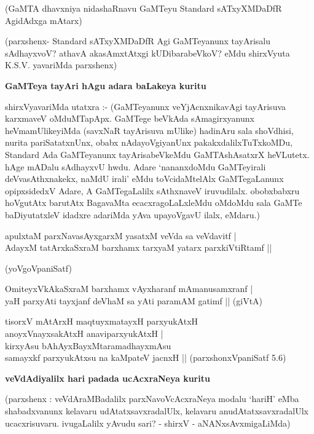 \noindent
(GaMTA dhavxniya nidashaRnavu GaMTeyu {\rm Standard} sATxyXMDaDfR AgidAdxga mAtarx)

(parxshenx- {\rm Standard} sATxyXMDaDfR Agi GaMTeyanunx tayArisalu sAdhayxvoV? athavA akasAmxtAtxgi kUDibarabeVkoV? eMdu shirxVyuta {\rm K.S.V.} yavariMda parxshenx)

{\bigskip
\noindent
{\large\bf GaMTeya tayAri hAgu adara baLakeya kuritu}}\label{page148}
\medskip

\noindent
shirxVyavariMda utatxra :- (GaMTeyanunx veYjAcnxnikavAgi tayArisuva karxmaveV oMduMTapApx. GaMTege beVkAda sAmagirxyanunx heVmamUlikeyiMda (savxNaR tayArisuva mUlike) hadinAru sala shoVdhisi, nurita pariSatatxnUnx, obabx nAdayoVgiyanUnx pakakxdalilxTuTxkoMDu, {\rm Standard} Ada GaMTeyanunx tayArisabeVkeMdu GaMTAshAsatxrX heVLutetx. hAge mADalu sAdhayxvU hwdu. Adare `nananxdoMdu GaMTeyirali deVvasAthxnakekx, naMdU irali' eMdu toVcidaMtelAlx GaMTegaLanunx opipxsidedxV Adare, A GaMTegaLalilx sAthxnaveV iruvudilalx. obobxbabxru hoVgutAtx barutAtx BagavaMta ecacxragoLaLxleMdu oMdoMdu sala GaMTe baDiyutatxleV idadxre adariMda yAva upayoVgavU ilalx, eMdaru.)
\begin{itemize}
{\bf 
\item[30.] apulxtaM parxNavasAyxgarxM yasatxM veVda sa veVdavitf |\\\label{148a}
AdayxM tatArxkaSxraM barxhamx tarxyaM yatarx parxkiVtiRtamf ||

\hfill{(yoVgoVpaniSatf)}
\item[31.] OmiteyxVkAkaSxraM barxhamx vAyxharanf mAmanusamxranf |\\\label{148b}
yaH parxyAti tayxjanf deVhaM sa yAti paramAM gatimf ||
\hfill{(giVtA)}
\item[32.] tisorxV mAtArxH maqtuyxmatayxH parxyukAtxH\\\label{148c}
anoyxVnayxsakAtxH anaviparxyukAtxH |\\
kirxyAsu bAhAyxBayxMtaramadhayxmAsu\\
samayxkf parxyukAtxsu na kaMpateV jacnxH ||
\hfill{(parxshonxVpaniSatf 5.6)}}
\end{itemize}

\newpage

{\bigskip
\noindent
{\large\bf veVdAdiyalilx hari padada ucAcxraNeya kuritu}}\label{page149}
\medskip

\noindent
(parxshenx : veVdAraMBadalilx parxNavoVcAcxraNeya modalu `hariH' eMba shabadxvanunx kelavaru udAtatxsavxradalUlx, kelavaru anudAtatxsavxradalUlx ucacxrisuvaru. ivugaLalilx yAvudu sari? - shirxV - aNANxsAvxmigaLiMda)

